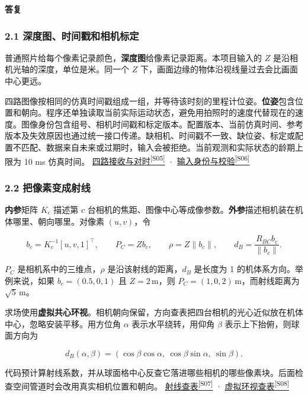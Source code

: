 \documentclass[11pt,a4paper]{article}
\numberwithin{equation}{topic}
\newenvironment{reply}{%
  \par\noindent\textcolor{replycolor}{\sffamily\bfseries 答复}\par\nobreak\ignorespaces
}{\par\medskip}
\newcommand{\sourceref}[2]{\hyperlink{source-#1}{#2\textsuperscript{[#1]}}}
\begin{document}
\begin{reply}
\subsubsection*{2.1 深度图、时间戳和相机标定}

普通照片给每个像素记录颜色，\textbf{深度图}给像素记录距离。本项目输入的 \(Z\) 是沿相机光轴的深度，单位是米。同一个 \(Z\) 下，画面边缘的物体沿视线量过去会比画面中心更远。

四路图像按相同的仿真时间戳组成一组，并等待该时刻的里程计位姿。\textbf{位姿}包含位置和朝向。程序还单独读取当前实际运动状态，避免用拍照时的速度代替现在的速度。图像身份包含组号、相机时间戳和标定版本。配置版本、当前仿真时间、参考版本及失效原因也通过统一接口传递。缺相机、时间戳不一致、缺位姿、标定或配置不匹配、数据来自未来或过期时，输入会被拒绝。当前观测和实际状态的龄期上限为 10 ms 仿真时间。 \sourceref{S05}{四路接收与对时} · \sourceref{S06}{输入身份与校验}

\subsubsection*{2.2 把像素变成射线}

\textbf{内参}矩阵 \(K_c\) 描述第 \(c\) 台相机的焦距、图像中心等成像参数。\textbf{外参}描述相机装在机体哪里、朝向哪里。对像素 \((u,v)\)，令

\begin{equation}
\label{eq:ray}
b_c=K_c^{-1}[u,v,1]^\top,\qquad
P_C=Zb_c,\qquad
\rho=Z\|b_c\|,\qquad
d_B=\frac{R_{BC}b_c}{\|b_c\|}.
\end{equation}

\(P_C\) 是相机系中的三维点，\(\rho\) 是沿该射线的距离，\(d_B\) 是长度为 1 的机体系方向。举例来说，如果 \(b_c=(0.5,0,1)\) 且 \(Z=2\,\mathrm m\)，则 \(P_C=(1,0,2)\,\mathrm m\)，而射线距离为 \(\sqrt5\,\mathrm m\)。

求场使用\textbf{虚拟共心环视}。相机朝向保留，方向查表把四台相机的光心近似放在机体中心，忽略安装平移。用方位角 \(\alpha\) 表示水平绕转，用仰角 \(\beta\) 表示上下抬俯，则球面方向为

\begin{equation}
\label{eq:sphere}
d_B(\alpha,\beta)=
(\cos\beta\cos\alpha,\ \cos\beta\sin\alpha,\ \sin\beta).
\end{equation}

代码预计算射线系数，并从球面格中心反查它落进哪些相机的哪些像素块。后面检查空间管道时会改用真实相机位置和朝向。 \sourceref{S07}{射线查表} · \sourceref{S08}{虚拟环视查表}


\end{reply}
\end{document}
